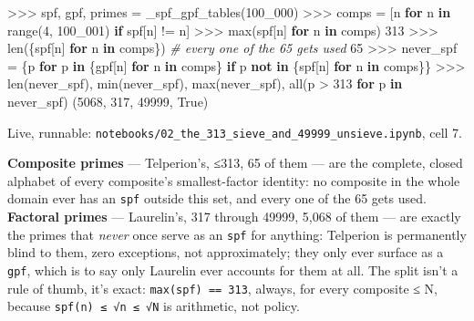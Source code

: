 \documentclass[
  10pt,
]{article}
\newenvironment{Shaded}{}{}
\newcommand{\BuiltInTok}[1]{\textcolor[rgb]{0.00,0.50,0.00}{#1}}
\newcommand{\CommentTok}[1]{\textcolor[rgb]{0.38,0.63,0.69}{\textit{#1}}}
\newcommand{\ControlFlowTok}[1]{\textcolor[rgb]{0.00,0.44,0.13}{\textbf{#1}}}
\newcommand{\DecValTok}[1]{\textcolor[rgb]{0.25,0.63,0.44}{#1}}
\newcommand{\KeywordTok}[1]{\textcolor[rgb]{0.00,0.44,0.13}{\textbf{#1}}}
\newcommand{\NormalTok}[1]{#1}
\newcommand{\OperatorTok}[1]{\textcolor[rgb]{0.40,0.40,0.40}{#1}}
\newcommand{\VariableTok}[1]{\textcolor[rgb]{0.10,0.09,0.49}{#1}}
\begin{document}
\begin{Shaded}
\begin{Highlighting}[]
\OperatorTok{\textgreater{}\textgreater{}\textgreater{}}\NormalTok{ spf, gpf, primes }\OperatorTok{=}\NormalTok{ \_spf\_gpf\_tables(}\DecValTok{100\_000}\NormalTok{)}
\OperatorTok{\textgreater{}\textgreater{}\textgreater{}}\NormalTok{ comps }\OperatorTok{=}\NormalTok{ [n }\ControlFlowTok{for}\NormalTok{ n }\KeywordTok{in} \BuiltInTok{range}\NormalTok{(}\DecValTok{4}\NormalTok{, }\DecValTok{100\_001}\NormalTok{) }\ControlFlowTok{if}\NormalTok{ spf[n] }\OperatorTok{!=}\NormalTok{ n]}
\OperatorTok{\textgreater{}\textgreater{}\textgreater{}} \BuiltInTok{max}\NormalTok{(spf[n] }\ControlFlowTok{for}\NormalTok{ n }\KeywordTok{in}\NormalTok{ comps)}
\DecValTok{313}
\OperatorTok{\textgreater{}\textgreater{}\textgreater{}} \BuiltInTok{len}\NormalTok{(\{spf[n] }\ControlFlowTok{for}\NormalTok{ n }\KeywordTok{in}\NormalTok{ comps\})            }\CommentTok{\# every one of the 65 gets used}
\DecValTok{65}
\OperatorTok{\textgreater{}\textgreater{}\textgreater{}}\NormalTok{ never\_spf }\OperatorTok{=}\NormalTok{ \{p }\ControlFlowTok{for}\NormalTok{ p }\KeywordTok{in}\NormalTok{ \{gpf[n] }\ControlFlowTok{for}\NormalTok{ n }\KeywordTok{in}\NormalTok{ comps\} }\ControlFlowTok{if}\NormalTok{ p }\KeywordTok{not} \KeywordTok{in}\NormalTok{ \{spf[n] }\ControlFlowTok{for}\NormalTok{ n }\KeywordTok{in}\NormalTok{ comps\}\}}
\OperatorTok{\textgreater{}\textgreater{}\textgreater{}} \BuiltInTok{len}\NormalTok{(never\_spf), }\BuiltInTok{min}\NormalTok{(never\_spf), }\BuiltInTok{max}\NormalTok{(never\_spf), }\BuiltInTok{all}\NormalTok{(p }\OperatorTok{\textgreater{}} \DecValTok{313} \ControlFlowTok{for}\NormalTok{ p }\KeywordTok{in}\NormalTok{ never\_spf)}
\NormalTok{(}\DecValTok{5068}\NormalTok{, }\DecValTok{317}\NormalTok{, }\DecValTok{49999}\NormalTok{, }\VariableTok{True}\NormalTok{)}
\end{Highlighting}
\end{Shaded}

Live, runnable:
\texttt{notebooks/02\_the\_313\_sieve\_and\_49999\_unsieve.ipynb}, cell
7.

\textbf{Composite primes} --- Telperion's, ≤313, 65 of them --- are the
complete, closed alphabet of every composite's smallest-factor identity:
no composite in the whole domain ever has an \texttt{spf} outside this
set, and every one of the 65 gets used. \textbf{Factoral primes} ---
Laurelin's, 317 through 49999, 5,068 of them --- are exactly the primes
that \emph{never} once serve as an \texttt{spf} for anything: Telperion
is permanently blind to them, zero exceptions, not approximately; they
only ever surface as a \texttt{gpf}, which is to say only Laurelin ever
accounts for them at all. The split isn't a rule of thumb, it's exact:
\texttt{max(spf)\ ==\ 313}, always, for every composite ≤ N, because
\texttt{spf(n)\ ≤\ √n\ ≤\ √N} is arithmetic, not policy.
\end{document}
